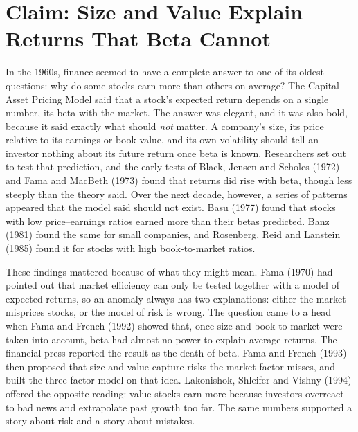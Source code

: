 
\chapter{Claim: Size and Value Explain Returns That Beta Cannot}
\label{ch:03}

In the 1960s, finance seemed to have a complete answer to one of its oldest questions: why do some stocks earn more than others on average? The Capital Asset Pricing Model said that a stock's expected return depends on a single number, its beta with the market. The answer was elegant, and it was also bold, because it said exactly what should \emph{not} matter. A company's size, its price relative to its earnings or book value, and its own volatility should tell an investor nothing about its future return once beta is known. Researchers set out to test that prediction, and the early tests of Black, Jensen and Scholes (1972) and Fama and MacBeth (1973) found that returns did rise with beta, though less steeply than the theory said. Over the next decade, however, a series of patterns appeared that the model said should not exist. Basu (1977) found that stocks with low price--earnings ratios earned more than their betas predicted. Banz (1981) found the same for small companies, and Rosenberg, Reid and Lanstein (1985) found it for stocks with high book-to-market ratios.

These findings mattered because of what they might mean. Fama (1970) had pointed out that market efficiency can only be tested together with a model of expected returns, so an anomaly always has two explanations: either the market misprices stocks, or the model of risk is wrong. The question came to a head when Fama and French (1992) showed that, once size and book-to-market were taken into account, beta had almost no power to explain average returns. The financial press reported the result as the death of beta. Fama and French (1993) then proposed that size and value capture risks the market factor misses, and built the three-factor model on that idea. Lakonishok, Shleifer and Vishny (1994) offered the opposite reading: value stocks earn more because investors overreact to bad news and extrapolate past growth too far. The same numbers supported a story about risk and a story about mistakes.


